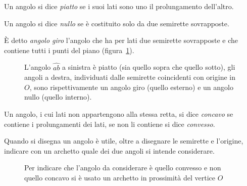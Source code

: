 \begin{definizione}
Un angolo si dice \emph{piatto} se i suoi lati sono uno il 
prolungamento dell'altro.
\end{definizione}

\begin{definizione}
Un angolo si dice \emph{nullo} se è costituito solo da due semirette 
sovrapposte.
\end{definizione}

\begin{definizione}
\`E detto \emph{angolo giro} l'angolo che ha per lati due semirette 
sovrapposte e che contiene tutti i punti del piano 
(figura~\ref{fig:1.19}).
\end{definizione}

\begin{inaccessibleblock}
 \begin{figure}[bth]
 \centering 
 \caption{L'angolo  $\widehat{ab}$ a sinistra è piatto (sia quello 
sopra che quello sotto), gli angoli a destra, individuati dalle 
semirette coincidenti con origine in $O$, sono rispettivamente un 
angolo giro (quello esterno) e un angolo nullo (quello 
interno).}\label{fig:1.19}
\end{figure}
\end{inaccessibleblock}

\begin{definizione}
Un angolo, i cui lati non appartengono alla stessa retta, si dice 
\emph{concavo} se contiene i prolungamenti dei lati, se non li 
contiene si dice \emph{convesso}.
\end{definizione}

\begin{figure*}[htb]
\centering  
\caption{L'angolo concavo è quello in giallo in quanto contiene i 
prolungamenti dei lati (punteggiati)}\label{fig:1.20}
\end{figure*}

Quando si disegna un angolo è utile, oltre a disegnare le semirette e 
l'origine, indicare con un archetto quale dei due angoli si intende 
considerare.


\begin{inaccessibleblock}
 \begin{figure}[htb]
 \centering 
\caption{Per indicare che l'angolo da considerare è quello convesso e 
non quello concavo si è usato un archetto in prossimità del vertice 
$O$}\label{fig:1.21}
\end{figure}
\end{inaccessibleblock}

